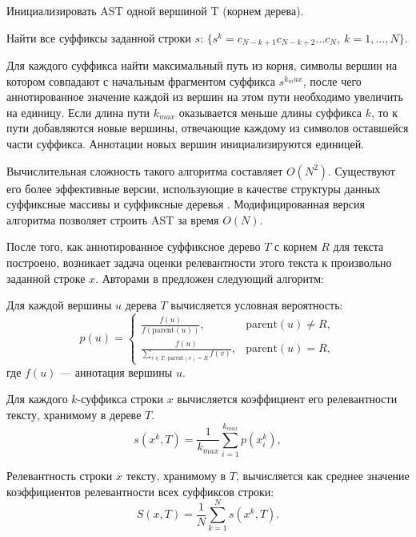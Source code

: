 \documentclass[12pt]{article}
\newenvironment{enumerate*}%
{\begin{enumerate}%
	\setlength{\itemsep}{0pt}%
	\setlength{\parskip}{0pt}}%
{\end{enumerate}}
\begin{document}
\begin{enumerate*}
	\item Инициализировать AST одной вершиной T (корнем дерева).
	\item Найти все суффиксы заданной строки $s$: $\{s^k=c_{N-k+1}c_{N-k+2}\ldots c_{N}, \ k=1,\ldots, N\}$.
	\item Для каждого суффикса найти максимальный путь из корня, символы вершин на котором совпадают с начальным фрагментом суффикса $s^{k_max}$, после чего аннотированное значение каждой из вершин на этом пути необходимо увеличить на единицу. Если длина пути $k_{max}$ оказывается меньше длины суффикса $k$, то к пути добавляются новые вершины, отвечающие каждому из символов оставшейся части суффикса. Аннотации новых вершин инициализируются единицей.
\end{enumerate*}
Вычислительная сложность такого алгоритма составляет $O(N^2)$. Существуют его более эффективные версии, использующие в качестве структуры данных суффиксные массивы и суффиксные деревья \cite{Grossi_2005}. Модифицированная версия алгоритма позволяет строить AST за время $O(N)$.

После того, как аннотированное суффиксное дерево $T$ с корнем $R$ для текста построено, возникает задача оценки релевантности этого текста к произвольно заданной строке $x$. Авторами в \cite{MirkinChernyak2012} предложен следующий алгоритм:
\begin{enumerate*}
	
	\item  Для каждой вершины $u$ дерева $T$ вычисляется условная вероятность:
	{\sffamily
	\begin{equation}
		p(u)=\begin{cases}
			\displaystyle	\frac{f(u)}{f(\text{parent}(u))}, & \text{parent}(u) \ne R,\\[15pt]
			\displaystyle	\frac{f(u)}{\sum_{v\in T:\ \text{parent}(v)=R}f(v)}, & \text{parent}(u) = R,
		\end{cases}
	\end{equation}
	}
	где $f(u)$ --- аннотация вершины $u$. 
	\item Для каждого $k$-суффикса строки $x$ вычисляется коэффициент его релевантности тексту, хранимому в дереве $T$. 
	\begin{equation}
		s(x^k, T)=\frac{1}{k_{max}}\sum_{i=1}^{k_{max}}p(x_i^k),
	\end{equation}
	\item Релевантность строки $x$ тексту, хранимому в $T$, вычисляется как среднее значение коэффициентов релевантности всех суффиксов строки:
	\begin{equation}
		S(x,T)=\frac1N\sum_{k=1}^{N}s(x^k, T).
	\end{equation}
\end{enumerate*}
\end{document}
